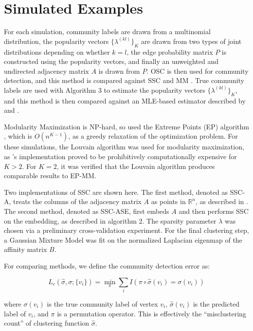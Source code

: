 \documentclass[12pt]{article}
\begin{document}
\hypertarget{simulated-examples}{%
\section{Simulated Examples}\label{simulated-examples}}

For each simulation, community labels are drawn from a multinomial
distribution, the popularity vectors \(\{\lambda^{(kl)}\}_K\) are drawn
from two types of joint distributions depending on whether \(k = l\),
the edge probability matrix \(P\) is constructed using the popularity
vectors, and finally an unweighted and undirected adjacency matrix \(A\)
is drawn from \(P\). OSC is then used for community detection, and this
method is compared against SSC \cite{noroozi2019estimation,soltanolkotabi2014}
and MM \cite{igraph, 307cbeb9b1be48299388437423d94bf1}. 
True community labels are used
with Algorithm 3 to estimate the popularity vectors
\(\{\lambda^{(kl)}\}_K\), and this method is then compared against an
MLE-based estimator described by \citet{noroozi2019estimation} and
\citet{307cbeb9b1be48299388437423d94bf1}.

Modularity Maximization is NP-hard, so
\citet{307cbeb9b1be48299388437423d94bf1} used the Extreme Points
(EP) algorithm \cite{le2016}, which is \(O(n^{K - 1})\), as a greedy
relaxation of the optimization problem. For these simulations, the
Louvain algorithm was used for modularity maximization,
as \citet{307cbeb9b1be48299388437423d94bf1}'s implementation proved to be
prohibitively computationally expensive for \(K > 2\). For \(K = 2\), it
was verified that the Louvain algorithm produces comparable results
to EP-MM.

Two implementations of SSC are shown here. The first method, denoted as
SSC-A, treats the columns of the adjacency matrix \(A\) as points in
\(\mathbb{R}^n\), as described in \citet{noroozi2019estimation}.
The second method, denoted as SSC-ASE, first embeds \(A\) and then
performs SSC on the embedding, as described in algorithm 2. The sparsity
parameter \(\lambda\) was chosen via a preliminary cross-validation
experiment. For the final clustering step, a Gaussian Mixture Model was
fit on the normalized Laplacian eigenmap of the affinity matrix \(B\).

For comparing methods, we define the community detection error as:

\[L_c(\hat{\sigma}, \sigma; \{v_i\}) =
\min_\pi \sum_i I(\pi \circ \hat{\sigma}(v_i) = \sigma(v_i))\]

where \(\sigma(v_i)\) is the true community label of vertex \(v_i\),
\(\hat{\sigma}(v_i)\) is the predicted label of \(v_i\), and \(\pi\) is
a permutation operator. This is effectively the ``misclustering count''
of clustering function \(\hat{\sigma}\).
\end{document}
